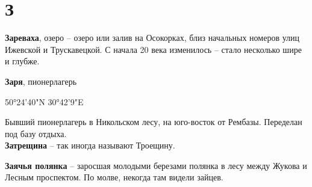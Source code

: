 \chapter*{З}

\textbf{Зареваха}, озеро – озеро или залив на Осокорках, близ начальных номеров улиц Ижевской и Трускавецкой. С начала 20 века изменилось – стало несколько шире и глубже.\\

\medskip


\textbf{Заря}, пионерлагерь 

50°24'40"N 30°42'9"E

Бывший пионерлагерь в Никольском лесу, на юго-восток от Рембазы. Переделан под базу отдыха.\\

\textbf{Затрещина} – так иногда называют Троещину.\\

\medskip


\textbf{Заячья полянка} – заросшая молодыми березами полянка в лесу между Жукова и Лесным проспектом. По молве, некогда там видели зайцев.
